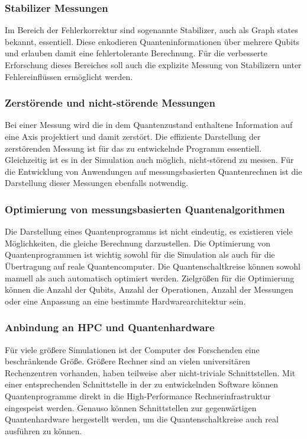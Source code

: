\documentclass[11pt, a4paper]{article}
\begin{document}
\subsubsection{Stabilizer Messungen}

Im Bereich der Fehlerkorrektur sind sogenannte Stabilizer, auch als
Graph states bekannt, essentiell. Diese enkodieren
Quanteninformationen über mehrere Qubits und erlauben damit eine
fehlertolerante Berechnung. Für die verbesserte Erforschung dieses
Bereiches soll auch die explizite Messung von Stabilizern unter
Fehlereinflüssen ermöglicht werden.

\subsubsection{Zerstörende und nicht-störende Messungen}

Bei einer Messung wird die in dem Quantenzustand enthaltene
Information auf eine Axis projektiert und damit zerstört. Die
effiziente Darstellung der zerstörenden Messung ist für das zu
entwickelnde Programm essentiell. Gleichzeitig ist es in der
Simulation auch möglich, nicht-störend zu messen. Für die Entwicklung
von Anwendungen auf messungsbasierten Quantenrechnen ist die
Darstellung dieser Messungen ebenfalls notwendig.

\subsubsection{Optimierung von messungsbasierten Quantenalgorithmen}

Die Darstellung eines Quantenprogramms ist nicht eindeutig, es
existieren viele Möglichkeiten, die gleiche Berechnung
darzustellen. Die Optimierung von Quantenprogrammen ist wichtig sowohl
für die Simulation als auch für die Übertragung auf reale
Quantencomputer. Die Quantenschaltkreise können sowohl manuell als
auch automatisch optimiert werden. Zielgrößen für die Optimierung
können die Anzahl der Qubits, Anzahl der Operationen, Anzahl der
Messungen oder eine Anpassung an eine bestimmte Hardwarearchitektur
sein.

\subsubsection{Anbindung an HPC und Quantenhardware}

Für viele größere Simulationen ist der Computer des Forschenden eine
beschränkende Größe. Größere Rechner sind an vielen universitären
Rechenzentren vorhanden, haben teilweise aber nicht-triviale
Schnittstellen. Mit einer entsprechenden Schnittstelle in der zu
entwickelnden Software können Quantenprogramme direkt in die
High-Performance Rechnerinfrastruktur eingespeist werden. Genauso
können Schnittstellen zur gegenwärtigen Quantenhardware hergestellt
werden, um die Quantenschaltkreise auch real ausführen zu können.
\end{document}
